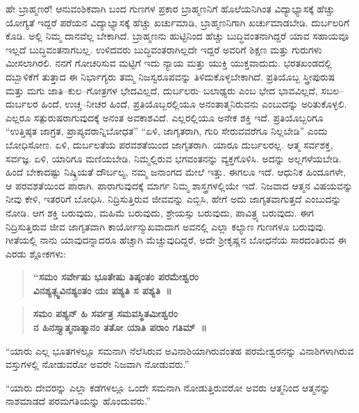ಹೇ ಬ್ರಾಹ್ಮಣರೆ! ಆನುವಂಶಿಕವಾಗಿ ಬಂದ ಗುಣಗಳ ಪ್ರಕಾರ ಬ್ರಾಹ್ಮಣನಿಗೆ ಹೊಲೆಯನಿಗಿಂತ ವಿದ್ಯಾಭ್ಯಾಸಕ್ಕೆ ಹೆಚ್ಚು ಯೋಗ್ಯತೆ ಇದ್ದರೆ ಪರೆಯನ ವಿದ್ಯಾಭ್ಯಾಸಕ್ಕೆ ಹೆಚ್ಚು ಖರ್ಚುಮಾಡಿ, ಬ್ರಾಹ್ಮಣನಿಗಾಗಿ ಖರ್ಚುಮಾಡಬೇಡಿ. ದುರ್ಬಲರಿಗೆ ಕೊಡಿ. ಅಲ್ಲಿ ನಿಮ್ಮ ದಾನವೆಲ್ಲ ಬೇಕಾಗಿದೆ. ಬ್ರಾಹ್ಮಣನು ಹುಟ್ಟಿನಿಂದ ಹೆಚ್ಚು ಬುದ್ಧಿವಂತನಾಗಿದ್ದರೆ ಯಾವ ಸಹಾಯವೂ ಇಲ್ಲದೆ ಬುದ್ಧಿವಂತನಾಗಬಲ್ಲ. ಉಳಿದವರು ಬುದ್ಧಿವಂತರಾಗಿಲ್ಲದೇ ಇದ್ದರೆ ಅವರಿಗೆ ಶಿಕ್ಷಣ ಮತ್ತು ಗುರುಗಳು ಮೀಸಲಾಗಿರಲಿ. ನನಗೆ ಗೋಚರಿಸುವ ಮಟ್ಟಿಗೆ ಇದು ನ್ಯಾಯ ಮತ್ತು ಯುಕ್ತಿ ಯುಕ್ತವಾದುದು. ಭರತಖಂಡದಲ್ಲಿ ದಬ್ಬಾಳಿಕೆಗೆ ತುತ್ತಾದ ಈ ನಿರ್ಭಾಗ್ಯರು ತಮ್ಮ ನಿಜಸ್ವರೂಪವನ್ನು ತಿಳಿದುಕೊಳ್ಳಬೇಕಾಗಿದೆ. ಪ್ರತಿಯೊಬ್ಬ ಸ್ತ್ರೀಪುರುಷ ಮತ್ತು ಮಗು ಜಾತಿ–ಕುಲ–ಗೋತ್ರಗಳ ಭೇದವಿಲ್ಲದೆ, ದುರ್ಬಲರು–ಬಲಾಢ್ಯರು ಎಂಬ ಭೇದ ಭಾವವಿಲ್ಲದೆ, ಸಬಲ–ದುರ್ಬಲರ ಹಿಂದೆ, ಉಚ್ಚ–ನೀಚರ ಹಿಂದೆ, ಪ್ರತಿಯೊಬ್ಬರಲ್ಲಿಯೂ ಅನಂತಾತ್ಮನಿರುವನು ಎಂಬುದನ್ನು ಅರಿತುಕೊಳ್ಳಲಿ. ಎಲ್ಲರೂ ಸತ್ಪುರುಷರಾಗುವುದಕ್ಕೆ ಅನಂತ ಅವಕಾಶವಿದೆ. ಎಲ್ಲರಲ್ಲಿಯೂ ಅನೇಕ ಶಕ್ತಿ ಇದೆ. ಪ್ರತಿಯೊಬ್ಬರಿಗೂ “ಉತ್ತಿಷ್ಠತ ಜಾಗ್ರತ, ಪ್ರಾಪ್ಯವರಾನ್ನಿಬೋಧತ” “ಏಳಿ, ಜಾಗೃತರಾಗಿ, ಗುರಿ ಸೇರುವವರೆಗೂ ನಿಲ್ಲಬೇಡಿ” ಎಂದು ಬೋಧಿಸೋಣ. ಏಳಿ, ದುರ್ಬಲತೆಯ ಪರವಶತೆಯಿಂದ ಜಾಗೃತರಾಗಿ. ಯಾರೂ ದುರ್ಬಲರಲ್ಲ. ಆತ್ಮ ಸರ್ವಶಕ್ತ, ಸರ್ವಜ್ಞ. ಏಳಿ, ಯಾರಿಗೂ ಮಣಿಯಬೇಡಿ. ನಿಮ್ಮಲ್ಲಿರುವ ಭಗವಂತನನ್ನು ವ್ಯಕ್ತಗೊಳಿಸಿ. ಅದನ್ನು ಅಲ್ಲಗಳೆಯಬೇಡಿ. ಹಿಂದೆ ಬೇಕಾದಷ್ಟು ನಿಷ್ಕ್ರಿಯತೆ ದೌರ್ಬಲ್ಯ, ನಮ್ಮ ಜನಾಂಗದ ಮೇಲೆ ಇತ್ತು. ಈಗಲೂ ಇದೆ. ಆಧುನಿಕ ಹಿಂದೂಗಳೇ, ಆ ಪರವಶತೆಯಿಂದ ಪಾರಾಗಿ. ಪಾರಾಗುವುದಕ್ಕೆ ಮಾರ್ಗ ನಿಮ್ಮ ಶಾಸ್ತ್ರಗಳಲ್ಲಿಯೇ ಇದೆ. ನಿಜವಾದ ಆತ್ಮನ ವಿಷಯವನ್ನು ನೀವು ಕೇಳಿ, ಇತರರಿಗೆ ಬೋಧಿಸಿ. ನಿದ್ರಿಸುತ್ತಿರುವ ಜೀವವನ್ನು ಎಬ್ಬಿಸಿ, ಹೇಗೆ ಅದು ಜಾಗೃತವಾಗುತ್ತದೆ ಎಂಬುದನ್ನು ನೋಡಿ. ಆಗ ಶಕ್ತಿ ಬರುವುದು, ಮಹಿಮೆ ಬರುವುದು, ಶ್ರೇಯಸ್ಸು ಬರುವುದು, ಪಾವಿತ್ರ್ಯ ಬರುವುದು. ಈಗ ನಿದ್ರಿಸುತ್ತಿರುವ ಜೀವ ಜಾಗೃತವಾಗಿ ಕಾರ್ಯೋನ್ಮುಖವಾದಾಗ ಅವನಲ್ಲಿ ಎಲ್ಲಾ ಕಲ್ಯಾಣ ಗುಣಗಳೂ ಬರುವುವು. ಗೀತೆಯಲ್ಲಿ ನಾನು ಯಾವುದನ್ನಾದರೂ ಹೆಚ್ಚಾಗಿ ಮೆಚ್ಚುವುದಿದ್ದರೆ, ಅದೇ ಶ‍್ರೀಕೃಷ್ಣನ ಬೋಧನೆಯ ಸಾರದಂತಿರುವ ಈ ಎರಡು ಶ್ಲೋಕಗಳು:

\begin{verse}
\textbf{“ಸಮಂ ಸರ್ವೇಷು ಭೂತೇಷು ತಿಷ್ಠಂತಂ ಪರಮೇಶ್ವರಂ}\\\textbf{ವಿನಶ್ಯತ್ಸ್ವವಿನಶ್ಯಂತಂ ಯಃ ಪಶ್ಯತಿ ಸ ಪಶ್ಯತಿ~॥}
\end{verse}

\begin{verse}
\textbf{ಸಮಂ ಪಶ್ಯನ್​ ಹಿ ಸರ್ವತ್ರ ಸಮವಸ್ಥಿತಮೀಶ್ವರಂ}\\\textbf{ನ ಹಿನಸ್ತ್ಯಾತ್ಮನಾತ್ಮಾನಂ ತತೋ ಯಾತಿ ಪರಾಂ ಗತಿಮ್​~॥}
\end{verse}

“ಯಾರು ಎಲ್ಲ ಭೂತಗಳಲ್ಲೂ ಸಮನಾಗಿ ನೆಲೆಸಿರುವ ಅವಿನಾಶಿಯಾಗಿರುವಂತಹ ಪರಮೇಶ್ವರನನ್ನು ವಿನಾಶಿಗಳಾಗಿರುವ ವಸ್ತುಗಳಲ್ಲಿ ನೋಡುವರೋ ಅವರೇ ನಿಜವಾಗಿ ನೋಡುವರು.”

“ಯಾರು ದೇವರನ್ನು ಎಲ್ಲಾ ಕಡೆಗಳಲ್ಲೂ ಒಂದೇ ಸಮನಾಗಿ ನೋಡುತ್ತಿರುವರೋ ಅವರು ಆತ್ಮನಿಂದ ಆತ್ಮನನ್ನು ನಾಶಮಾಡದೆ ಪರಮಗತಿಯನ್ನು ಹೊಂದುವರು.”

\vskip 0.2cm

